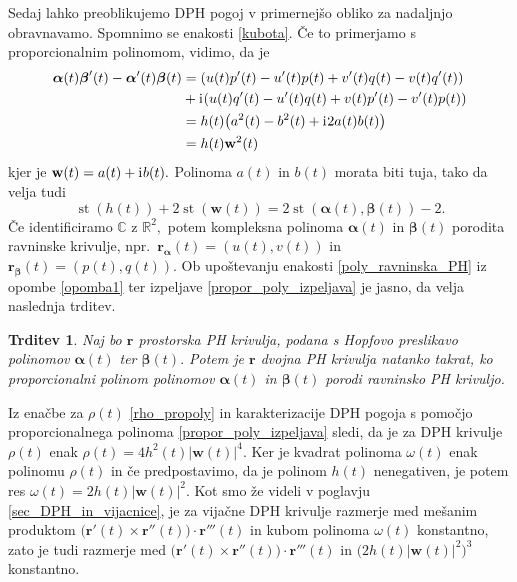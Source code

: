\documentclass[12pt,a4paper,twoside]{article}
\newcommand{\iu}{\mathrm{i}\mkern1mu} %
\theoremstyle{definition} %
\theoremstyle{plain} %
\newtheorem{trditev}[definicija]{Trditev}
\numberwithin{equation}{section}  %
\newcommand{\R}{\mathbb R}
\renewcommand{\C}{\mathbb C}
\newcommand{\rV}{\mathbf{r}}
\newcommand{\wV}{\mathbf{w}}
\newcommand{\balpha}{\boldsymbol \alpha}
\newcommand{\bbeta}{\boldsymbol \beta}
\DeclareMathOperator{\st}{st}
\begin{document}
Sedaj lahko preoblikujemo DPH pogoj v primernejšo obliko za nadaljnjo obravnavamo. Spomnimo se enakosti \eqref{kubota}. Če to primerjamo s proporcionalnim polinomom, vidimo, da je
\begin{align}
	\balpha(t)\bbeta'(t)-\balpha'(t)\bbeta(t)&=(u(t)p'(t)-u'(t)p(t)+v'(t)q(t)-v(t)q'(t))\nonumber \\
	&+\iu(u(t)q'(t)-u'(t)q(t)+v(t)p'(t)-v'(t)p(t)) \nonumber \\
	&=h(t)\big(a^2(t)-b^2(t)+\iu 2a(t)b(t)\big) \nonumber \\
	&=h(t)\wV^2(t) \label{propor_poly_izpeljava}
\end{align}
kjer je $\wV(t)=a(t)+\iu b(t).$ Polinoma $a(t)$ in $b(t)$ morata biti tuja, tako da velja tudi
\begin{equation}
	\st(h(t))+2\st(\wV(t))=2\st(\balpha(t),\bbeta(t))-2.
	\end{equation}
Če identificiramo $\C$ z $\R^2,$ potem kompleksna polinoma $\balpha(t)$ in $\bbeta(t)$ porodita ravninske krivulje, npr.\ $\rV_{\balpha}(t)=(u(t),v(t))$ in $\rV_{\bbeta}(t)=(p(t),q(t)).$ Ob upoštevanju enakosti \eqref{poly_ravninska_PH} iz opombe \ref{opomba1} ter izpeljave \eqref{propor_poly_izpeljava} je jasno, da velja naslednja trditev.
\begin{trditev}
	Naj bo $\rV$ prostorska PH krivulja, podana s Hopfovo preslikavo polinomov $\balpha(t)$ ter $\bbeta(t).$ Potem je $\rV$ dvojna PH krivulja natanko takrat, ko proporcionalni polinom polinomov $\balpha(t)$ in $\bbeta(t)$ porodi ravninsko PH krivuljo.
\end{trditev}

Iz enačbe za $\rho(t)$ \eqref{rho_propoly} in karakterizacije DPH pogoja s pomočjo proporcionalnega polinoma \eqref{propor_poly_izpeljava} sledi, da je za DPH krivulje $\rho(t)$ enak $\rho(t)=4h^2(t)|\wV(t)|^4.$ Ker je kvadrat polinoma $\omega(t)$ enak polinomu $\rho(t)$ in če predpostavimo, da je polinom $h(t)$ nenegativen, je potem res $\omega(t)=2h(t)|\wV(t)|^2.$ Kot smo že videli v poglavju \ref{sec_DPH_in_vijacnice}, je za vijačne DPH krivulje razmerje med mešanim produktom $\big(\rV'(t)\times\rV''(t)\big)\cdot\rV'''(t)$ in kubom polinoma $\omega(t)$ konstantno, zato je tudi razmerje med $\big(\rV'(t)\times\rV''(t)\big)\cdot\rV'''(t)$ in $\big(2h(t)|\wV(t)|^2\big)^3$ konstantno.
\end{document}
